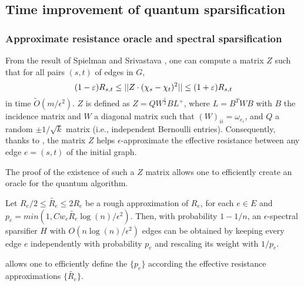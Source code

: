 \subsection{Time improvement of quantum sparsification}


\subsubsection{Approximate resistance oracle and spectral sparsification}

From the result of Spielman and Srivastava \cite{spielman_graph_2011},
one can compute a matrix $Z$ such that for all pairs $(s,t)$ of edges in $G$,
\begin{equation}\label{eq:matrix-z}
    (1-\varepsilon) R_{s,t} \leq || Z\cdot(\chi_s-\chi_t)^2 || \leq (1+\varepsilon) R_{s,t}
\end{equation}
in time $\tilde{O}(m/\epsilon^2)$. $Z$ is defined as $Z = QW^{\frac{1}{2}}BL^+$,
where $L=B^TWB$ with $B$ the incidence matrix and $W$ a diagonal matrix
such that $(W)_{ii} = \omega_{e_i}$, and $Q$ a random $\pm 1/\sqrt k$ matrix
(i.e., independent Bernoulli entries). Consequently, thanks to ,
the matrix $Z$ helps $\epsilon$-approximate the effective resistance between any edge $e = (s,t)$
of the initial graph.

The proof of the existence of such a $Z$ matrix allows one to
efficiently create an oracle for the quantum algorithm.


\begin{theorem} \label{th:app-resistance-oracle}
Let $R_e/2 \leq \tilde{R_e} \leq 2R_e$ be a rough approximation of $R_e$,
for each $e\in E$ and $p_e = min(1,Cw_e\tilde{R_e}\log(n)/\epsilon^2)$. Then,
with probability $1-1/n$, an $\epsilon$-spectral sparsifier $H$
with $O(n\log(n)/\epsilon^2)$ edges can be obtained by keeping every edge $e$
independently with probability $p_e$ and rescaling its weight with $1/p_e$.
\end{theorem}

 allows one to efficiently define the $\{p_e\}$ according the effective resistance approximations $\{\tilde {R_e}\}$.

